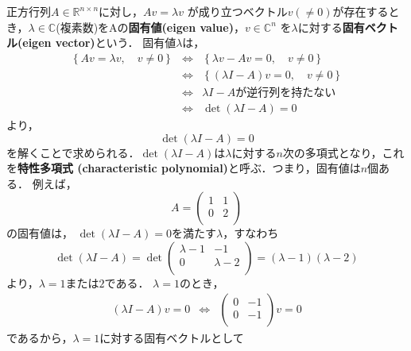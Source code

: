 正方行列$A \in {\mathbb R}^{n \times n}$に対し，$A v = \lambda v$
が成り立つベクトル$v (\neq 0)$が存在するとき，$\lambda \in {\mathbb C}$(複素数)をAの{\bf {固有値}(eigen value)}，$v \in {\mathbb C}^n$
を$\lambda$に対する{\bf {固有ベクトル}(eigen vector)}という．
固有値$\lambda$は，
\[
 \begin{array}{rcl}
  \left\{A v = \lambda v, \quad v \neq 0\right\} 
   &\Leftrightarrow& \left\{\lambda v - Av = 0, \quad v \neq 0\right\} \\
   &\Leftrightarrow& \left\{(\lambda I - A)v = 0, \quad v \neq 0\right\} \\
  &\Leftrightarrow& \lambda I - A が逆行列を持たない \\
  &\Leftrightarrow& \det(\lambda I - A) = 0
 \end{array}
\]
より，
\begin{equation}
	\det(\lambda I - A) = 0
\end{equation}
を解くことで求められる．$\det(\lambda I - A)$は$\lambda$に対する$n$次の多項式となり，これを{\bf {特性多項式} (characteristic polynomial)}と呼ぶ．つまり，固有値は$n$個ある．
例えば，
\begin{equation}
 A = \left(
      \begin{array}{cc}
       1 & 1 \\
       0 & 2 \\
      \end{array}
     \right)
\end{equation}
の固有値は，
$\det(\lambda I - A) = 0$を満たす$\lambda$，すなわち
\begin{equation}
 \det(\lambda I - A) = 
 \det
 \left(
 \begin{array}{cc}
  \lambda - 1 & -1 \\
  0           & \lambda - 2 \\
 \end{array}
 \right) =
 (\lambda - 1)(\lambda - 2) 
\end{equation}
より，$\lambda = 1 または 2$である．
$\lambda = 1$のとき，
\begin{equation}
 \begin{array}{ccc}
 (\lambda I - A) v = 0 
 &\Leftrightarrow&
 \left(
 \begin{array}{cc}
  0 & -1 \\
  0 & -1 \\
 \end{array}
 \right) v = 0 
 \end{array}
\end{equation}
であるから，$\lambda = 1$に対する固有ベクトルとして
